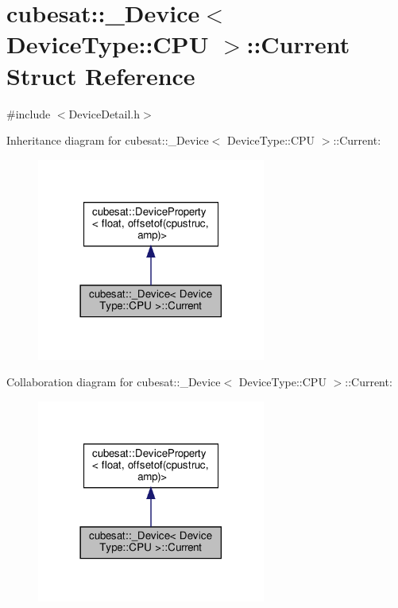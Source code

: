 \hypertarget{structcubesat_1_1__Device_3_01DeviceType_1_1CPU_01_4_1_1Current}{}\section{cubesat\+:\+:\+\_\+\+Device$<$ Device\+Type\+:\+:C\+PU $>$\+:\+:Current Struct Reference}
\label{structcubesat_1_1__Device_3_01DeviceType_1_1CPU_01_4_1_1Current}


{\ttfamily \#include $<$Device\+Detail.\+h$>$}



Inheritance diagram for cubesat\+:\+:\+\_\+\+Device$<$ Device\+Type\+:\+:C\+PU $>$\+:\+:Current\+:\nopagebreak
\begin{figure}[H]
\begin{center}
\leavevmode
\includegraphics[width=213pt]{structcubesat_1_1__Device_3_01DeviceType_1_1CPU_01_4_1_1Current__inherit__graph}
\end{center}
\end{figure}


Collaboration diagram for cubesat\+:\+:\+\_\+\+Device$<$ Device\+Type\+:\+:C\+PU $>$\+:\+:Current\+:\nopagebreak
\begin{figure}[H]
\begin{center}
\leavevmode
\includegraphics[width=213pt]{structcubesat_1_1__Device_3_01DeviceType_1_1CPU_01_4_1_1Current__coll__graph}
\end{center}
\end{figure}
